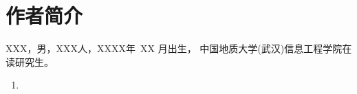\chapter*{作者简介}
\xiaosi
\begin{spacing}{1.2}
XXX，男，XXX人，XXXX年~XX 月出生，
中国地质大学(武汉)信息工程学院在读研究生。
% 
\end{spacing}
\begin{enumerate}
\item 
\end{enumerate}
